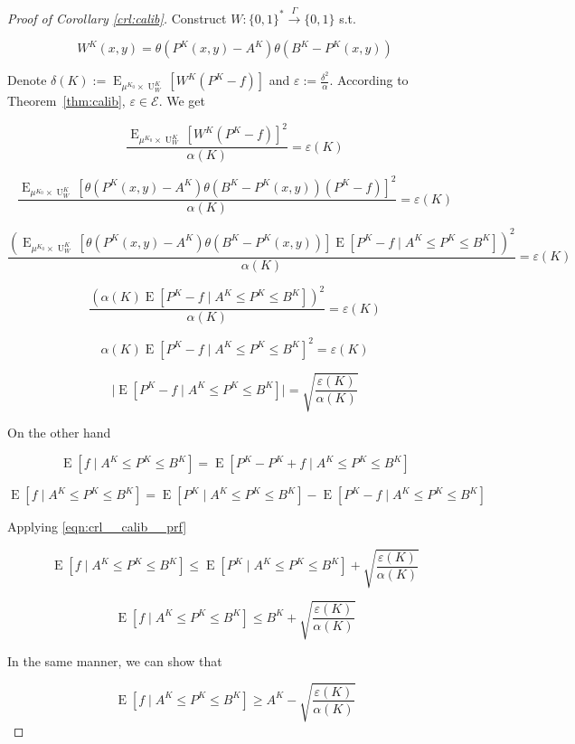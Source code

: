 \documentclass{article}
\numberwithin{equation}{section}
\theoremstyle{definition}
\theoremstyle{plain}
\newcommand{\Bool}{\{0,1\}}
\newcommand{\Words}{{\Bool^*}}
\DeclareMathOperator{\E}{E}
\DeclareMathOperator{\Un}{U}
\newcommand{\Abs}[1]{\lvert #1 \rvert}
\newcommand{\Fall}{\mathcal{E}}
\newcommand{\Scheme}{\xrightarrow{\Gamma}}
\begin{document}
\begin{proof}[Proof of Corollary \ref{crl:calib}]

Construct $W: \Words \Scheme \Bool$ s.t. 

\[W^{K}(x,y)=\theta(P^{K}(x,y)-A^{K})\theta(B^{K}-P^{K}(x,y))\] 

Denote $\delta(K):=\E_{\mu^{K_0} \times \Un_W^{K}}[W^{K}(P^{K}-f)]$ and $\varepsilon:=\frac{\delta^2}{\alpha}$. According to Theorem~\ref{thm:calib}, $\varepsilon \in \Fall$.
We get

$$\frac{\E_{\mu^{K_0} \times \Un_W^{K}}[W^{K}(P^{K}-f)]^2}{\alpha(K)} = \varepsilon(K)$$

$$\frac{\E_{\mu^{K_0} \times \Un_W^{K}}[\theta(P^{K}(x,y)-A^{K})\theta(B^{K}-P^{K}(x,y))(P^{K}-f)]^2}{\alpha(K)} = \varepsilon(K)$$

$$\frac{(\E_{\mu^{K_0} \times \Un_W^{K}}[\theta(P^{K}(x,y)-A^{K})\theta(B^{K}-P^{K}(x,y))]\E[P^{K}-f \mid A^{K} \leq P^{K} \leq B^{K}])^2}{\alpha(K)} = \varepsilon(K)$$

$$\frac{(\alpha(K)\E[P^{K}-f \mid A^{K} \leq P^{K} \leq B^{K}])^2}{\alpha(K)} = \varepsilon(K)$$

$$\alpha(K)\E[P^{K}-f \mid A^{K} \leq P^{K} \leq B^{K}]^2 = \varepsilon(K)$$

\begin{equation}
\label{eqn:crl__calib__prf}
\Abs{\E[P^{K}-f \mid A^{K} \leq P^{K} \leq B^{K}]} = \sqrt{\frac{\varepsilon(K)}{\alpha(K)}}
\end{equation}

On the other hand

$$\E[f \mid A^{K} \leq P^{K} \leq B^{K}] = \E[P^{K}-P^{K}+f \mid A^{K} \leq P^{K} \leq B^{K}]$$

$$\E[f \mid A^{K} \leq P^{K} \leq B^{K}] = \E[P^{K} \mid A^{K} \leq P^{K} \leq B^{K}]-\E[P^{K}-f \mid A^{K} \leq P^{K} \leq B^{K}]$$

Applying \ref{eqn:crl__calib__prf}

$$\E[f \mid A^{K} \leq P^{K} \leq B^{K}] \leq \E[P^{K} \mid A^{K} \leq P^{K} \leq B^{K}]+\sqrt{\frac{\varepsilon(K)}{\alpha(K)}}$$


$$\E[f \mid A^{K} \leq P^{K} \leq B^{K}] \leq B^{K} + \sqrt{\frac{\varepsilon(K)}{\alpha(K)}}$$

In the same manner, we can show that

$$\E[f \mid A^{K} \leq P^{K} \leq B^{K}] \geq A^{K} - \sqrt{\frac{\varepsilon(K)}{\alpha(K)}}$$
\end{proof}
\end{document}
